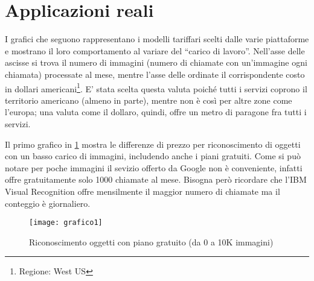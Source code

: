\section{Applicazioni reali}
I grafici che seguono rappresentano i modelli tariffari scelti dalle varie piattaforme e mostrano il loro comportamento al variare del ``carico di lavoro''.
Nell'asse delle ascisse si trova il numero di immagini (numero di chiamate con un'immagine ogni chiamata) processate al mese,
mentre l'asse delle ordinate il corrispondente costo in dollari americani\footnote{Regione: West US}.
E' stata scelta questa valuta poiché tutti i servizi coprono il territorio americano (almeno in parte), mentre non è così per altre zone come l'europa;
una valuta come il dollaro, quindi, offre un metro di paragone fra tutti i servizi.

Il primo grafico in \ref{grafico-1} mostra le differenze di prezzo per riconoscimento di oggetti con un basso carico di immagini, includendo anche i piani gratuiti.
Come si può notare per poche immagini il sevizio offerto da Google non è conveniente, infatti offre gratuitamente solo 1000 chiamate al mese. 
Bisogna però ricordare che l'IBM Visual Recognition offre mensilmente il maggior numero di chiamate ma il conteggio è giornaliero. 
\begin{figure}[htbp]
\begin{center}
	\texttt{[image: grafico1]}
\caption{Riconoscimento oggetti con piano gratuito (da 0 a 10K immagini)}
\label{grafico-1}
\end{center}
\end{figure}
%
%

